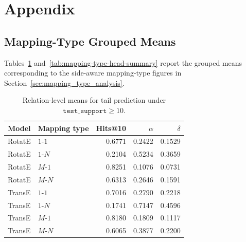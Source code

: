 \section{Appendix}
\label{chap:appendix}

\subsection{Mapping-Type Grouped Means}
\label{app:mapping-type-tables}

Tables~\ref{tab:mapping-type-tail-summary}
and~\ref{tab:mapping-type-head-summary} report the grouped means corresponding
to the side-aware mapping-type figures in
Section~\ref{sec:mapping_type_analysis}.

\begin{table}[H]
    \centering
    \caption{Relation-level means for tail prediction under
    \(\texttt{test\_support}\geq 10\).}
    \label{tab:mapping-type-tail-summary}
    \small
    \begin{tabular}{llrrr}
        \toprule
        Model & Mapping type & Hits@10 & \(\alpha\) & \(\delta\) \\
        \midrule
        RotatE & \(1\)-\(1\) & 0.6771 & 0.2422 & 0.1529 \\
        RotatE & \(1\)-\(N\) & 0.2104 & 0.5234 & 0.3659 \\
        RotatE & \(M\)-\(1\) & 0.8251 & 0.1076 & 0.0731 \\
        RotatE & \(M\)-\(N\) & 0.6313 & 0.2646 & 0.1591 \\
        TransE & \(1\)-\(1\) & 0.7016 & 0.2790 & 0.2218 \\
        TransE & \(1\)-\(N\) & 0.1741 & 0.7147 & 0.4596 \\
        TransE & \(M\)-\(1\) & 0.8180 & 0.1809 & 0.1117 \\
        TransE & \(M\)-\(N\) & 0.6065 & 0.3877 & 0.2200 \\
        \bottomrule
    \end{tabular}
\end{table}

